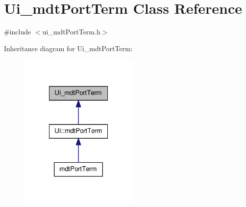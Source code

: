 \hypertarget{class_ui__mdt_port_term}{\section{Ui\-\_\-mdt\-Port\-Term Class Reference}
\label{class_ui__mdt_port_term}
}


{\ttfamily \#include $<$ui\-\_\-mdt\-Port\-Term.\-h$>$}



Inheritance diagram for Ui\-\_\-mdt\-Port\-Term\-:
\nopagebreak
\begin{figure}[H]
\begin{center}
\leavevmode
\includegraphics[width=168pt]{class_ui__mdt_port_term__inherit__graph}
\end{center}
\end{figure}


